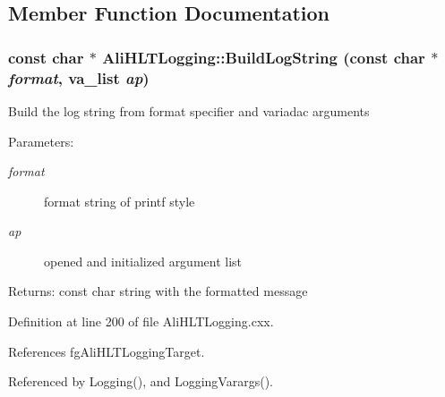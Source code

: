 \subsection{Member Function Documentation}
\subsubsection{\setlength{\rightskip}{0pt plus 5cm}const char $\ast$ Ali\-HLTLogging::Build\-Log\-String (const char $\ast$ {\em format}, va\_\-list {\em ap})\hspace{0.3cm}{\tt  [static]}}\label{classAliHLTLogging_e5}


Build the log string from format specifier and variadac arguments \begin{Desc}
\item[Parameters:]
\begin{description}
\item[{\em format}]format string of printf style \item[{\em ap}]opened and initialized argument list \end{description}
\end{Desc}
\begin{Desc}
\item[Returns:]const char string with the formatted message \end{Desc}


Definition at line 200 of file Ali\-HLTLogging.cxx.

References fg\-Ali\-HLTLogging\-Target.

Referenced by Logging(), and Logging\-Varargs().

